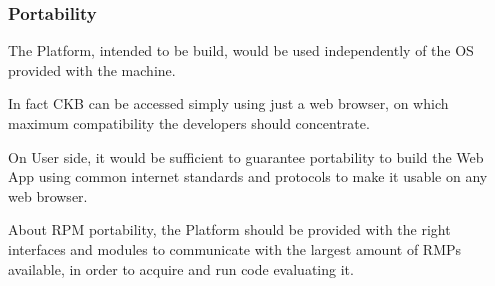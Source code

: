 \subsubsection{Portability}
The Platform, intended to be build, would be used independently of the OS provided with the machine. 

In fact CKB can be accessed simply using just a web browser, on which maximum compatibility the developers should concentrate. 

On User side, it would be sufficient to guarantee portability to build the Web App using common internet standards and protocols to make it usable on any web browser.

About RPM portability, the Platform should be provided with the right interfaces and modules to communicate with the largest amount of RMPs available, in order to acquire and run code evaluating it.